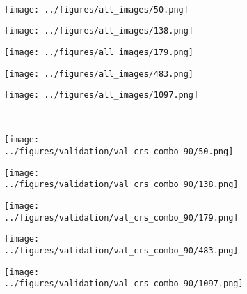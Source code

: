\begin{figure}[h!]
\begin{subfigure}{0.19\textwidth}
		\label{fig:1}
	\end{subfigure}
	\vspace{-0.35cm}
	\\
	\begin{subfigure}{0.19\textwidth}
		\centering
		\texttt{[image: ../figures/all\_images/50.png]}
		\label{fig:1}
	\end{subfigure}
	\begin{subfigure}{0.19\textwidth}
		\centering
		\texttt{[image: ../figures/all\_images/138.png]}
		\label{fig:1}
	\end{subfigure}
	\begin{subfigure}{0.19\textwidth}
		\centering
		\texttt{[image: ../figures/all\_images/179.png]}
		\label{fig:1}
	\end{subfigure}
	\begin{subfigure}{0.19\textwidth}
		\centering
		\texttt{[image: ../figures/all\_images/483.png]}
		\label{fig:1}
	\end{subfigure}
	\begin{subfigure}{0.19\textwidth}
		\centering
		\texttt{[image: ../figures/all\_images/1097.png]}
		\label{fig:1}
	\end{subfigure}
	\vspace{-0.35cm}
	\\
	\begin{subfigure}{0.19\textwidth}
		\centering
		\texttt{[image: ../figures/validation/val\_crs\_combo\_90/50.png]}
		\label{fig:1}
	\end{subfigure}
	\begin{subfigure}{0.19\textwidth}
		\centering
		\texttt{[image: ../figures/validation/val\_crs\_combo\_90/138.png]}
		\label{fig:1}
	\end{subfigure}
	\begin{subfigure}{0.19\textwidth}
		\centering
		\texttt{[image: ../figures/validation/val\_crs\_combo\_90/179.png]}
		\label{fig:1}
	\end{subfigure}
	\begin{subfigure}{0.19\textwidth}
		\centering
		\texttt{[image: ../figures/validation/val\_crs\_combo\_90/483.png]}
		\label{fig:1}
	\end{subfigure}
	\begin{subfigure}{0.19\textwidth}
		\centering
		\texttt{[image: ../figures/validation/val\_crs\_combo\_90/1097.png]}
		\label{fig:1}
	\end{subfigure}

\end{figure}
